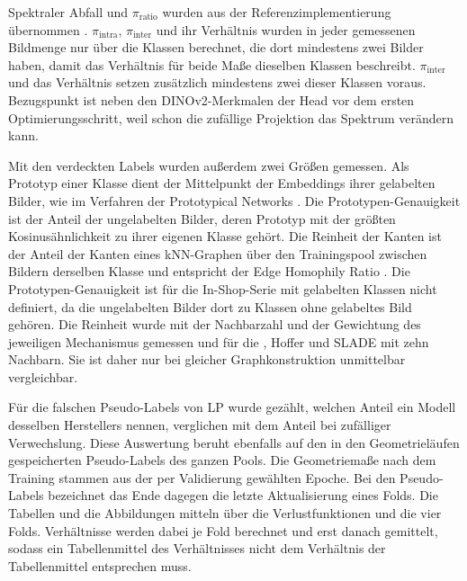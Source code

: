 Spektraler Abfall und $\pi_{\mathrm{ratio}}$ wurden aus der Referenzimplementierung übernommen \cite{roth_revisiting_2020}. $\pi_{\mathrm{intra}}$, $\pi_{\mathrm{inter}}$ und ihr Verhältnis wurden in jeder gemessenen Bildmenge nur über die Klassen berechnet, die dort mindestens zwei Bilder haben, damit das Verhältnis für beide Maße dieselben Klassen beschreibt. $\pi_{\mathrm{inter}}$ und das Verhältnis setzen zusätzlich mindestens zwei dieser Klassen voraus. Bezugspunkt ist neben den DINOv2-Merkmalen der Head vor dem ersten Optimierungsschritt, weil schon die zufällige Projektion das Spektrum verändern kann.

Mit den verdeckten Labels wurden außerdem zwei Größen gemessen. Als Prototyp einer Klasse dient der Mittelpunkt der Embeddings ihrer gelabelten Bilder, wie im Verfahren der Prototypical Networks \cite{snell_prototypical_2017}. Die Prototypen-Genauigkeit ist der Anteil der ungelabelten Bilder, deren Prototyp mit der größten Kosinusähnlichkeit zu ihrer eigenen Klasse gehört. Die Reinheit der Kanten ist der Anteil der Kanten eines \ac{kNN}-Graphen über den Trainingspool zwischen Bildern derselben Klasse und entspricht der Edge Homophily Ratio \cite{zhu_beyond_2020}. Die Prototypen-Genauigkeit ist für die In-Shop-Serie mit gelabelten Klassen nicht definiert, da die ungelabelten Bilder dort zu Klassen ohne gelabeltes Bild gehören. Die Reinheit wurde mit der Nachbarzahl und der Gewichtung des jeweiligen Mechanismus gemessen und für die \UEBL, Hoffer und \ac{SLADE} mit zehn Nachbarn. Sie ist daher nur bei gleicher Graphkonstruktion unmittelbar vergleichbar. 

Für die falschen Pseudo-Labels von \ac{LP} wurde gezählt, welchen Anteil ein Modell desselben Herstellers nennen, verglichen mit dem Anteil bei zufälliger Verwechslung. Diese Auswertung beruht ebenfalls auf den in den Geometrieläufen gespeicherten Pseudo-Labels des ganzen Pools. Die Geometriemaße nach dem Training stammen aus der per Validierung gewählten Epoche. Bei den Pseudo-Labels bezeichnet das Ende dagegen die letzte Aktualisierung eines Folds. Die Tabellen und die Abbildungen mitteln über die Verlustfunktionen und die vier Folds. Verhältnisse werden dabei je Fold berechnet und erst danach gemittelt, sodass ein Tabellenmittel des Verhältnisses nicht dem Verhältnis der Tabellenmittel entsprechen muss.

